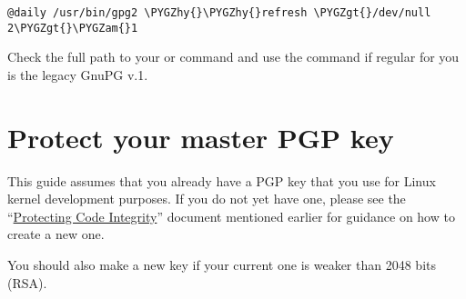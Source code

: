\documentclass[a4paper,8pt,english]{sphinxmanual}
\def\PYGZam{\char`\&}
\def\PYGZgt{\char`\>}
\def\PYGZhy{\char`\-}
\begin{document}
\begin{Verbatim}[commandchars=\\\{\}]
@daily /usr/bin/gpg2 \PYGZhy{}\PYGZhy{}refresh \PYGZgt{}/dev/null 2\PYGZgt{}\PYGZam{}1
\end{Verbatim}

Check the full path to your  or  command and use the
 command if regular  for you is the legacy GnuPG v.1.


\section{Protect your master PGP key}
\label{process/maintainer-pgp-guide:protect-your-master-pgp-key}\label{process/maintainer-pgp-guide:master-key}
This guide assumes that you already have a PGP key that you use for Linux
kernel development purposes. If you do not yet have one, please see the
``\href{https://github.com/lfit/itpol/blob/master/protecting-code-integrity.md}{Protecting Code Integrity}'' document mentioned earlier for guidance
on how to create a new one.

You should also make a new key if your current one is weaker than 2048 bits
(RSA).
\end{document}
